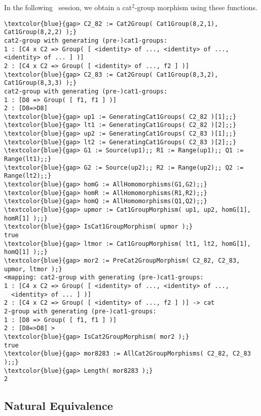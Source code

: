 \documentclass[a4paper,11pt]{article}
\theoremstyle{plain}
\theoremstyle{definition}
\begin{document}
In the following \GAP\ session, we obtain a cat$^{2}$-group morphism
using these functions.

\begin{Verbatim}[frame=single, fontsize=\small, commandchars=\\\{\}]
\textcolor{blue}{gap> C2_82 := Cat2Group( Cat1Group(8,2,1), Cat1Group(8,2,2) );}
cat2-group with generating (pre-)cat1-groups:
1 : [C4 x C2 => Group( [ <identity> of ..., <identity> of ...,
<identity> of ... ] )]
2 : [C4 x C2 => Group( [ <identity> of ..., f2 ] )]
\textcolor{blue}{gap> C2_83 := Cat2Group( Cat1Group(8,3,2), Cat1Group(8,3,3) );}
cat2-group with generating (pre-)cat1-groups:
1 : [D8 => Group( [ f1, f1 ] )]
2 : [D8=>D8]
\textcolor{blue}{gap> up1 := GeneratingCat1Groups( C2_82 )[1];;}
\textcolor{blue}{gap> lt1 := GeneratingCat1Groups( C2_82 )[2];;}
\textcolor{blue}{gap> up2 := GeneratingCat1Groups( C2_83 )[1];;}
\textcolor{blue}{gap> lt2 := GeneratingCat1Groups( C2_83 )[2];;}
\textcolor{blue}{gap> G1 := Source(up1);; R1 := Range(up1);; Q1 := Range(lt1);;}
\textcolor{blue}{gap> G2 := Source(up2);; R2 := Range(up2);; Q2 := Range(lt2);;}
\textcolor{blue}{gap> homG := AllHomomorphisms(G1,G2);;}
\textcolor{blue}{gap> homR := AllHomomorphisms(R1,R2);;}
\textcolor{blue}{gap> homQ := AllHomomorphisms(Q1,Q2);;}
\textcolor{blue}{gap> upmor := Cat1GroupMorphism( up1, up2, homG[1], homR[1] );;}
\textcolor{blue}{gap> IsCat1GroupMorphism( upmor );}
true
\textcolor{blue}{gap> ltmor := Cat1GroupMorphism( lt1, lt2, homG[1], homQ[1] );;}
\textcolor{blue}{gap> mor2 := PreCat2GroupMorphism( C2_82, C2_83, upmor, ltmor );}
<mapping: cat2-group with generating (pre-)cat1-groups:
1 : [C4 x C2 => Group( [ <identity> of ..., <identity> of ..., 
  <identity> of ... ] )]
2 : [C4 x C2 => Group( [ <identity> of ..., f2 ] )] -> cat
2-group with generating (pre-)cat1-groups:
1 : [D8 => Group( [ f1, f1 ] )]
2 : [D8=>D8] >
\textcolor{blue}{gap> IsCat2GroupMorphism( mor2 );}
true
\textcolor{blue}{gap> mor8283 := AllCat2GroupMorphisms( C2_82, C2_83 );;}
\textcolor{blue}{gap> Length( mor8283 );}
2
\end{Verbatim}




\subsection{Natural Equivalence}
\end{document}
